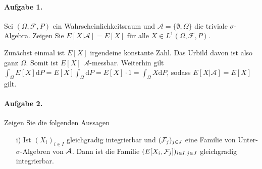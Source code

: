 \documentclass{article}
\begin{document}
\paragraph{Aufgabe 1.}
Sei $(\Omega,\mathscr{F},P)$ ein Wahrscheinlichkeitsraum und $\mathscr{A}=\{\emptyset,\Omega\}$ die triviale $\sigma$-Algebra.
Zeigen Sie $E[X|\mathscr{A}]=E[X]$ für alle $X\in L^1(\Omega,\mathscr{F},P)$.

Zunächst einmal ist $E[X]$ irgendeine konstante Zahl.
Das Urbild davon ist also ganz $\Omega$.
Somit ist $E[X]$ $\mathscr{A}$-messbar.
Weiterhin gilt $\int_{\Omega}E[X]\mathrm{d}P=E[X]\int_{\Omega}\mathrm{d}P=E[X]\cdot1=\int_\Omega X\mathrm{d}P$, sodass $E[X|\mathscr{A}]=E[X]$ gilt.

\paragraph{Aufgabe 2.} Zeigen Sie die folgenden Aussagen
\begin{enumerate}
\item[i)] Ist $(X_i)_{i\in I}$ gleichgradig integrierbar und $({\cal F}_j)_{j\in J}$ eine Familie von Unter-$\sigma$-Algebren von ${\cal A}$.
  Dann ist die Familie $(E[X_i,{\cal F}_j])_{i\in I,j\in J}$ gleichgradig integrierbar.
\end{enumerate}
\end{document}
